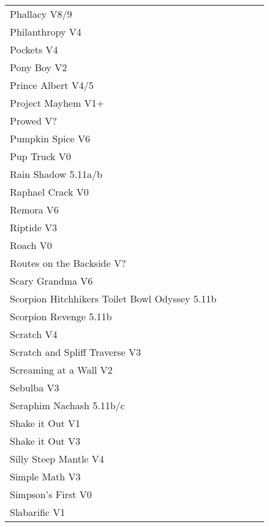 \begin{flushleft}
\begin{center}
\begin{supertabular}{p{0.76\linewidth}p{0.08\linewidth}}
Phallacy V8/9 & \pageref{rt:Phallacy} \\
Philanthropy V4 & \pageref{rt:Philanthropy} \\
Pockets V4 & \pageref{rt:Pockets} \\
Pony Boy V2 & \pageref{rt:Pony Boy} \\
Prince Albert V4/5 & \pageref{rt:Prince Albert} \\
Project Mayhem V1+ & \pageref{rt:Project Mayhem} \\
Prowed V? & \pageref{vr:Prowed} \\
Pumpkin Spice V6 & \pageref{rt:Pumpkin Spice} \\
Pup Truck V0 & \pageref{rt:Pup Truck} \\
Rain Shadow 5.11a/b & \pageref{rt:Rain Shadow} \\
Raphael Crack V0 & \pageref{rt:Raphael Crack} \\
Remora V6 & \pageref{rt:Remora} \\
Riptide V3 & \pageref{rt:Riptide} \\
Roach V0 & \pageref{rt:Roach} \\
Routes on the Backside V? & \pageref{rt:Backside of Office} \\
Scary Grandma V6 & \pageref{rt:Scary Grandma} \\
Scorpion Hitchhikers Toilet Bowl Odyssey 5.11b & \pageref{rt:Scorpion Hitchhikers Toilet Bowl Odyssey} \\
Scorpion Revenge 5.11b & \pageref{rt:Scorpion Revenge} \\
Scratch V4 & \pageref{rt:Scratch} \\
Scratch and Spliff Traverse V3 & \pageref{rt:Scratch and Spliff Traverse} \\
Screaming at a Wall V2 & \pageref{rt:Screaming at a Wall} \\
Sebulba V3 & \pageref{vr:Sebulba} \\
Seraphim Nachash 5.11b/c & \pageref{rt:Seraphim Nachash} \\
Shake it Out V1 & \pageref{rt:Shake it Out Frank} \\
Shake it Out V3 & \pageref{vr:Shake it Out} \\
Silly Steep Mantle V4 & \pageref{rt:Silly Steep Mantle} \\
Simple Math V3 & \pageref{rt:Simple Math} \\
Simpson's First V0 & \pageref{rt:Simpson's First} \\
Slabarific V1 & \pageref{rt:Slabarific} \\

\end{supertabular}
\end{center}
\end{flushleft}
